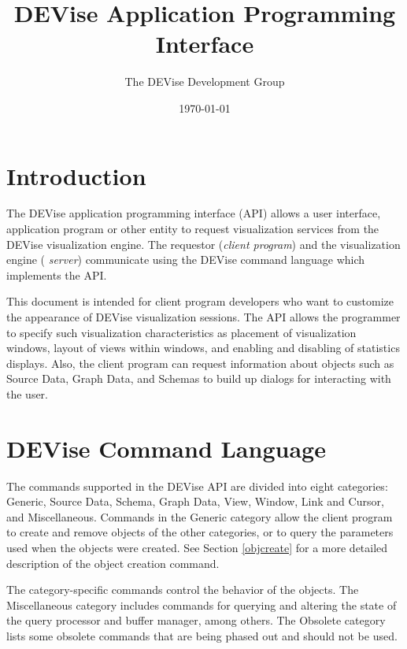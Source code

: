 \def\fullepspic#1#2{
\begin{figure}[htb]
\centering\leavevmode\epsfxsize=\textwidth\epsfbox{#1}
\caption{#2}
\end{figure}
}


\title{DEVise Application Programming Interface}
\author{The DEVise Development Group \\
}
\date{\today}

\maketitle

\section{Introduction}

The DEVise application programming interface (API) allows a user
interface, application program or other entity to request
visualization services from the DEVise visualization engine. The
requestor ({\em client program}) and the visualization engine ({\em
server}) communicate using the DEVise command language which
implements the API.

This document is intended for client program developers who want to
customize the appearance of DEVise visualization sessions. The API
allows the programmer to specify such visualization characteristics as
placement of visualization windows, layout of views within windows,
and enabling and disabling of statistics displays. Also, the client
program can request information about objects such as Source Data,
Graph Data, and Schemas to build up dialogs for interacting with the
user.

\section{DEVise Command Language}

The commands supported in the DEVise API are divided into eight
categories: Generic, Source Data, Schema, Graph Data, View, Window,
Link and Cursor, and Miscellaneous. Commands in the Generic category
allow the client program to create and remove objects of the other
categories, or to query the parameters used when the objects were
created. See Section \ref{objcreate} for a more detailed description
of the object creation command.

The category-specific commands control the behavior of the
objects. The Miscellaneous category includes commands for querying and
altering the state of the query processor and buffer manager, among
others. The Obsolete category lists some obsolete commands that are
being phased out and should not be used.


